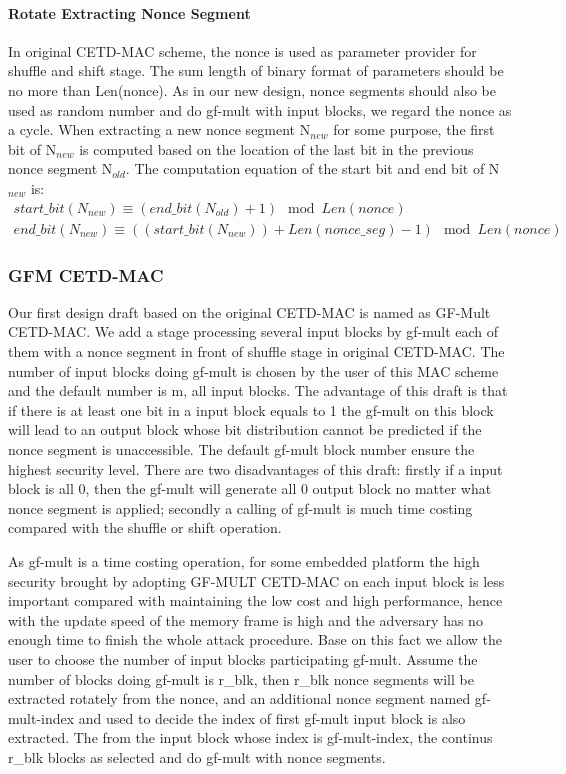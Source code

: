 \paragraph{Rotate Extracting Nonce Segment}
In original CETD-MAC scheme, the nonce is used as parameter provider for shuffle and shift stage. The sum length of binary format of parameters should be no more than Len(nonce). As in our new design, nonce segments should also be used as random number and do gf-mult with input blocks, we regard the nonce as a cycle. When extracting a new nonce segment N$_{new}$ for some purpose, the first bit of N$_{new}$ is computed based on the location of the last bit in the previous nonce segment N$_{old}$. The computation equation of the start bit and end bit of N$_{new}$ is:
\begin{gather}
start\_bit(N_{new}) \equiv (end\_bit(N_{old}) + 1) \mod Len(nonce) \\
end\_bit(N_{new}) \equiv ((start\_bit(N_{new})) + Len(nonce\_seg) - 1) \mod Len(nonce) 
\end{gather}


\subsubsection{GFM CETD-MAC}
Our first design draft based on the original CETD-MAC is named as GF-Mult CETD-MAC. We add a stage processing several input blocks by gf-mult each of them with a nonce segment in front of shuffle stage in original CETD-MAC. The number of input blocks doing gf-mult is chosen by the user of this MAC scheme and the default number is m, all input blocks. 
The advantage of this draft is that if there is at least one bit in a input block equals to 1 the gf-mult on this block will lead to an output block whose bit distribution cannot be predicted if the nonce segment is unaccessible. The default gf-mult block number ensure the highest security level. 
There are two disadvantages of this draft: firstly if a input block is all 0, then the gf-mult will generate all 0 output block no matter what nonce segment is applied; secondly a calling of gf-mult is much time costing compared with the shuffle or shift operation. 

As gf-mult is a time costing operation, for some embedded platform the high security brought by adopting GF-MULT CETD-MAC on each input block is less important compared with maintaining the low cost and high performance, hence with the update speed of the memory frame is high and the adversary has no enough time to finish the whole attack procedure. Base on this fact we allow the user to choose the number of input blocks participating gf-mult. Assume the number of blocks doing gf-mult is r\_blk, then r\_blk nonce segments will be extracted rotately from the nonce, and an additional nonce segment named gf-mult-index and used to decide the index of first gf-mult input block is also extracted. The from the input block whose index is gf-mult-index, the continus r\_blk blocks as selected and do gf-mult with nonce segments. 

